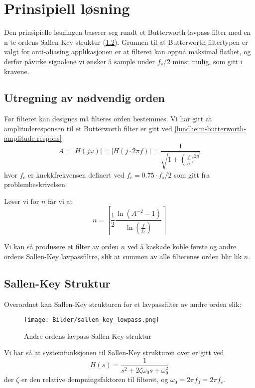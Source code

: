 \section{Prinsipiell løsning}
\label{prinsipiellLoesning}

Den prinsipielle løsningen baserer seg rundt et Butterworth lavpass filter med en n-te ordens Sallen-Key struktur (\ref{sallen-key}). 
Grunnen til at Butterworth filtertypen er valgt for anti-aliasing applikasjonen er at filteret kan oppnå maksimal flathet, og derfor 
påvirke signalene vi ønsker å sample under $f_s/2$ minst mulig, som gitt i kravene.

\subsection{Utregning av nødvendig orden}
Før filteret kan designes må filteres orden bestemmes. Vi har gitt at amplituderesponsen til et Butterworth filter 
er gitt ved \ref{lundheim-butterworth-amplitude-respons}
\begin{equation}
    A = |H(j\omega)| = |H(j \cdot 2\pi f)| = \frac{1}{\sqrt{1 + \left(\frac{f}{f_c})^{2n}}}
\end{equation}
hvor $f_c$ er knekkfrekvensen definert ved $f_c = 0.75 \cdot f_s / 2$ som gitt fra problembeskrivelsen.

Løser vi for $n$ får vi at
\begin{equation}
    n = \left\lceil\frac{1}{2}\frac{\ln{\left(A^{-2} - 1\right)}}{\ln{\left(\frac{f}{f_c}\right)}}\right\rceil
\end{equation}

Vi kan så produsere et filter av orden $n$ ved å kaskade koble første og andre ordens Sallen-Key lavpassfiltre, slik at 
summen av alle filterenes orden blir lik $n$.

\subsection{Sallen-Key Struktur}
\label{sallen-key}
Overordnet kan Sallen-Key strukturen for et lavpassfilter av andre orden slik:
\begin{figure}[H]
    \centering
    \texttt{[image: Bilder/sallen\_key\_lowpass.png]}
    \caption{Andre ordens lavpass Sallen-Key struktur \cite{sallen-key-lowpass-wikipedia}}
\end{figure}

Vi har så at systemfunksjonen til Sallen-Key strukturen over er gitt ved
\begin{equation}
    H(s) = \frac{1}{s^2 + 2\zeta\omega_0 s + \omega_0^2}
\end{equation}
der $\zeta$ er den relative dempningsfaktoren til filteret, og $\omega_0 = 2\pi f_0 = 2\pi f_c$.

